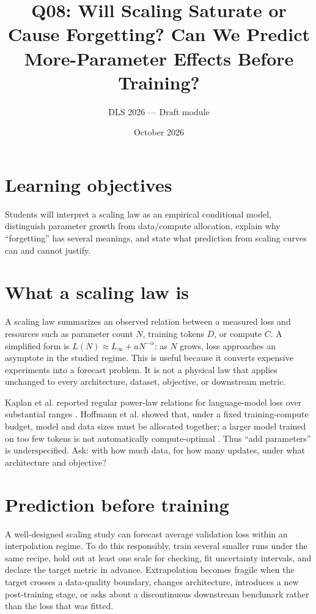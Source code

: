 \documentclass[11pt]{article}
\title{Q08: Will Scaling Saturate or Cause Forgetting? Can We Predict More-Parameter Effects Before Training?}
\author{DLS 2026 --- Draft module}\date{October 2026}
\begin{document}
\maketitle
\section*{Learning objectives}
Students will interpret a scaling law as an empirical conditional model, distinguish parameter growth from data/compute allocation, explain why ``forgetting'' has several meanings, and state what prediction from scaling curves can and cannot justify.

\section{What a scaling law is}
A scaling law summarizes an observed relation between a measured loss and resources such as parameter count $N$, training tokens $D$, or compute $C$. A simplified form is $L(N)\approx L_\infty+aN^{-\alpha}$: as $N$ grows, loss approaches an asymptote in the studied regime. This is useful because it converts expensive experiments into a forecast problem. It is not a physical law that applies unchanged to every architecture, dataset, objective, or downstream metric.

Kaplan et al. reported regular power-law relations for language-model loss over substantial ranges \cite{kaplan2020scaling}. Hoffmann et al. showed that, under a fixed training-compute budget, model and data sizes must be allocated together; a larger model trained on too few tokens is not automatically compute-optimal \cite{hoffmann2022training}. Thus ``add parameters'' is underspecified. Ask: with how much data, for how many updates, under what architecture and objective?

\section{Prediction before training}
A well-designed scaling study can forecast average validation loss within an interpolation regime. To do this responsibly, train several smaller runs under the same recipe, hold out at least one scale for checking, fit uncertainty intervals, and declare the target metric in advance. Extrapolation becomes fragile when the target crosses a data-quality boundary, changes architecture, introduces a new post-training stage, or asks about a discontinuous downstream benchmark rather than the loss that was fitted.
\end{document}
